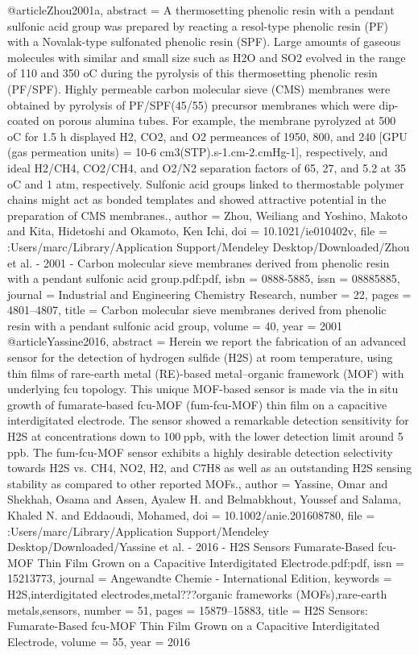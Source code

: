 @article{Zhou2001a,
abstract = {A thermosetting phenolic resin with a pendant sulfonic acid group was prepared by reacting a resol-type phenolic resin (PF) with a Novalak-type sulfonated phenolic resin (SPF). Large amounts of gaseous molecules with similar and small size such as H2O and SO2 evolved in the range of 110 and 350 oC during the pyrolysis of this thermosetting phenolic resin (PF/SPF). Highly permeable carbon molecular sieve (CMS) membranes were obtained by pyrolysis of PF/SPF(45/55) precursor membranes which were dip-coated on porous alumina tubes. For example, the membrane pyrolyzed at 500 oC for 1.5 h displayed H2, CO2, and O2 permeances of 1950, 800, and 240 [GPU (gas permeation units) = 10-6 cm3(STP).s-1.cm-2.cmHg-1], respectively, and ideal H2/CH4, CO2/CH4, and O2/N2 separation factors of 65, 27, and 5.2 at 35 oC and 1 atm, respectively. Sulfonic acid groups linked to thermostable polymer chains might act as bonded templates and showed attractive potential in the preparation of CMS membranes.},
author = {Zhou, Weiliang and Yoshino, Makoto and Kita, Hidetoshi and Okamoto, Ken Ichi},
doi = {10.1021/ie010402v},
file = {:Users/marc/Library/Application Support/Mendeley Desktop/Downloaded/Zhou et al. - 2001 - Carbon molecular sieve membranes derived from phenolic resin with a pendant sulfonic acid group.pdf:pdf},
isbn = {0888-5885},
issn = {08885885},
journal = {Industrial and Engineering Chemistry Research},
number = {22},
pages = {4801--4807},
title = {{Carbon molecular sieve membranes derived from phenolic resin with a pendant sulfonic acid group}},
volume = {40},
year = {2001}
}
@article{Yassine2016,
abstract = {Herein we report the fabrication of an advanced sensor for the detection of hydrogen sulfide (H2S) at room temperature, using thin films of rare-earth metal (RE)-based metal–organic framework (MOF) with underlying fcu topology. This unique MOF-based sensor is made via the in situ growth of fumarate-based fcu-MOF (fum-fcu-MOF) thin film on a capacitive interdigitated electrode. The sensor showed a remarkable detection sensitivity for H2S at concentrations down to 100 ppb, with the lower detection limit around 5 ppb. The fum-fcu-MOF sensor exhibits a highly desirable detection selectivity towards H2S vs. CH4, NO2, H2, and C7H8 as well as an outstanding H2S sensing stability as compared to other reported MOFs.},
author = {Yassine, Omar and Shekhah, Osama and Assen, Ayalew H. and Belmabkhout, Youssef and Salama, Khaled N. and Eddaoudi, Mohamed},
doi = {10.1002/anie.201608780},
file = {:Users/marc/Library/Application Support/Mendeley Desktop/Downloaded/Yassine et al. - 2016 - H2S Sensors Fumarate-Based fcu-MOF Thin Film Grown on a Capacitive Interdigitated Electrode.pdf:pdf},
issn = {15213773},
journal = {Angewandte Chemie - International Edition},
keywords = {H2S,interdigitated electrodes,metal???organic frameworks (MOFs),rare-earth metals,sensors},
number = {51},
pages = {15879--15883},
title = {{H2S Sensors: Fumarate-Based fcu-MOF Thin Film Grown on a Capacitive Interdigitated Electrode}},
volume = {55},
year = {2016}
}
